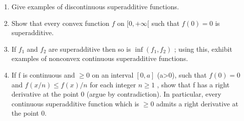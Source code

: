 \begin{enumerate}
\def\labelenumi{\alph{enumi})}
\item
  Give examples of discontinuous superadditive functions.
\item
  Show that every convex function \(f\) on \([0, +\infty[\) such that \(f(0) = 0\) is superadditive.
\item
  If \(f_{1}\) and \(f_{2}\) are superadditive then so is \(\inf (f_1, f_2)\) ; using this, exhibit examples of nonconvex continuous superadditive functions.
\item
  If f is continuous and \(\geqslant0\) on an interval \([0,a]\) (a\textgreater0), such that \(f(0)=0\) and \(f(x/n)\leqslant f(x)/n\) for each integer \(n\geqslant1\) , show that f has a right derivative at the point 0 (argue by contradiction). In particular, every continuous superadditive function which is \(\geqslant0\) admits a right derivative at the point 0.
\end{enumerate}

